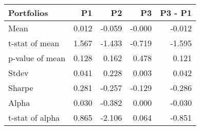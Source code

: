 \begin{tabular}{lrrrr}
\toprule
Portfolios & P1 & P2 & P3 & P3 - P1 \\
\midrule
Mean & 0.012 & -0.059 & -0.000 & -0.012 \\
t-stat of mean & 1.567 & -1.433 & -0.719 & -1.595 \\
p-value of mean & 0.128 & 0.162 & 0.478 & 0.121 \\
Stdev & 0.041 & 0.228 & 0.003 & 0.042 \\
Sharpe & 0.281 & -0.257 & -0.129 & -0.286 \\
Alpha & 0.030 & -0.382 & 0.000 & -0.030 \\
t-stat of alpha & 0.865 & -2.106 & 0.064 & -0.851 \\
\bottomrule
\end{tabular}
